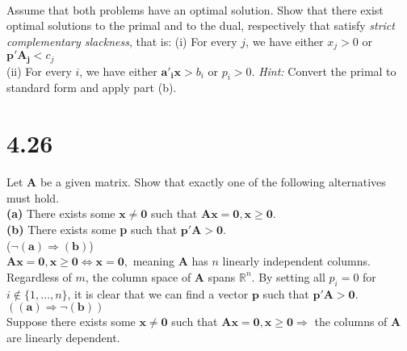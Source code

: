 \documentclass{article}
\begin{document}
\begin{Parallel}[v]{0.5\textwidth}{0.2\textwidth}
\ParallelPar
\end{Parallel}


\noindent \\
Assume that both problems have an optimal solution.  Show that there exist optimal solutions to the primal and to the dual, respectively that satisfy \emph{strict complementary slackness}, that is:
(i) For every $j$, we have either $x_j > 0$ or $\mathbf{p'A_j} < c_j$ \\
(ii) For every $i$, we have either $\mathbf{a'_i x} > b_i$ or $p_i > 0$.  \emph{Hint:} Convert the primal to standard form and apply part (b). \\

\section*{4.26} 
Let $\mathbf{A}$ be a given matrix.  Show that exactly one of the following alternatives must hold.\\

\noindent
\textbf{(a)} There exists some $\mathbf{x \neq 0}$ such that $\mathbf{Ax = 0, x \geq 0}$.\\
\textbf{(b)} There exists some \textbf{p} such that $\mathbf{p'A > 0}$. \\

\noindent
($\mathbf{\neg (a) \Rightarrow (b)}$) \\
\noindent
$\mathbf{Ax = 0, x \geq 0} \Leftrightarrow \mathbf{x = 0},$  meaning $\mathbf{A}$ has $n$ linearly independent columns.  Regardless of $m$, the column space of $\mathbf{A}$ spans $\mathbb{R}^n$.  By setting all $p_i = 0$ for $i \notin \{1, \dots, n\}$, it is clear that we can find a vector $\mathbf{p}$ such that $\mathbf{p'A > 0}$. \\

\noindent
$(\mathbf{(a) \Rightarrow \neg (b)})$ \\
Suppose there exists some $\mathbf{x \neq 0}$ such that $\mathbf{Ax = 0, x \geq 0} \Rightarrow $  the columns of $\mathbf{A}$ are linearly dependent.
\noindent
\end{document}
